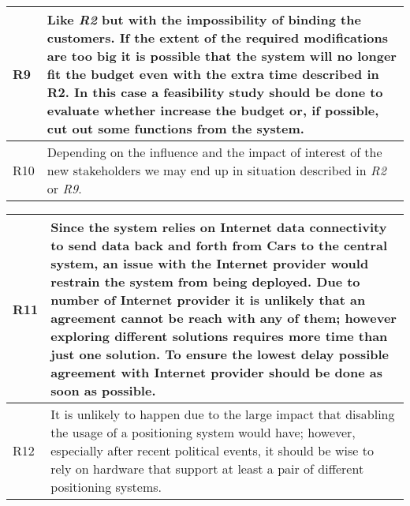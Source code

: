 \begin{tabular}{| l | p{13cm}  |}
\hline
R9 & Like \textit{R2} but with the impossibility of binding the customers. If the extent of the required modifications are too big it is possible that the system will no longer fit the budget even with the extra time described in R2. In this case a feasibility study should be done to evaluate whether increase the budget or, if possible, cut out some functions from the system.\\
\hline
R10 & Depending on the influence and the impact of interest of the new stakeholders we may end up in situation described in \textit{R2} or \textit{R9}.\\
\hline
\end{tabular}
\begin{tabular}{| l | p{13cm}  |}
\hline
R11 & Since the system relies on Internet data connectivity to send data back and forth from Cars to the central system, an issue with the Internet provider would restrain the system from being deployed. Due to number of Internet provider it is unlikely that an agreement cannot be reach with any of them; however exploring different solutions requires more time than just one solution. To ensure the lowest delay possible agreement with Internet provider should be done as soon as possible.\\
\hline
R12 & It is unlikely to happen due to the large impact that disabling the usage of a positioning system would have; however, especially after recent political events, it should be wise to rely on hardware that support at least a pair of different positioning systems.\\ 
\hline
\end{tabular}